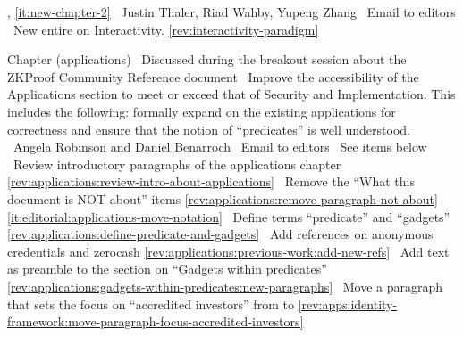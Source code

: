 \newcol {}, \ref{it:new-chapter-2}
\newcol \contributors\ Justin Thaler, Riad Wahby, Yupeng Zhang
				\submit\ Email to editors
				\Chan\ New entire  on Interactivity.
\newcol \ref{rev:interactivity-paradigm}
\rowendL
\myendIssue




Chapter (applications)
\newcol \ccontext\ Discussed during the breakout session about the ZKProof Community Reference document
				\propContrib\ Improve the accessibility of the Applications section to meet or exceed that of Security and Implementation. 
				This includes the following: formally expand on the existing applications for correctness and ensure that the notion of ``predicates'' is well understood.
\newcol {}
\newcol \contributors\ Angela Robinson and Daniel Benarroch
				\submit\ Email to editors
				\Chan\ See items below
\newcol 
\rowendL
\newcol
\newcol 
\newcol \Chan\ Review introductory paragraphs of the applications chapter
\newcol \ref{rev:applications:review-intro-about-applications}
\rowendL
\newcol
\newcol 
\newcol \Chan\ Remove the ``What this document is NOT about'' items
\newcol \ref{rev:applications:remove-paragraph-not-about}
\rowendL
\newcol
\newcol \ref{it:editorial:applications-move-notation}
\newcol \Chan\ Define terms ``predicate'' and ``gadgets''
\newcol \ref{rev:applications:define-predicate-and-gadgets}
\rowendL
\newcol
\newcol 
\newcol \Chan\ Add references on anonymous credentials and zerocash
\newcol \ref{rev:applications:previous-work:add-new-refs}
\rowendL
\newcol
\newcol 
\newcol \Chan\ Add text as preamble to the section on ``Gadgets within predicates''
\newcol \ref{rev:applications:gadgets-within-predicates:new-paragraphs}
\rowendL
\newcol
\newcol 
\newcol \Chan\ Move a paragraph that sets the focus on ``accredited investors'' from 
 to 
\newcol \ref{rev:apps:identity-framework:move-paragraph-focus-accredited-investors}
\rowendL
\myendIssue




